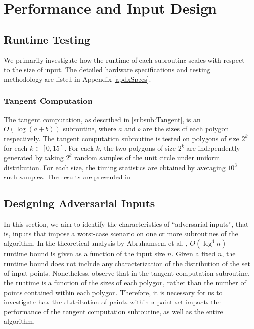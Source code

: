 \documentclass{article}
\newcommand{\apdxref}[1]{Appendix \ref{#1}}
\begin{document}
\section{Performance and Input Design}


\subsection{Runtime Testing}

We primarily investigate how the runtime of each subroutine scales with respect to the size of input. The detailed hardware specifications and testing methodology are listed in \apdxref{apdxSpecs}.

\subsubsection{Tangent Computation}

The tangent computation, as described in \ref{subsub:Tangent}, is an $O(\log(a + b))$ subroutine, where $a$ and $b$ are the sizes of each polygon respectively. The tangent computation subroutine is tested on polygons of size $2^k$ for each $k \in [0, 15]$. For each $k$, the two polygons of size $2^k$ are independently generated by taking $2^k$ random samples of the unit circle under uniform distribution. For each size, the timing statistics are obtained by averaging $10^3$ such samples. The results are presented in  

\subsection{Designing Adversarial Inputs}

In this section, we aim to identify the characteristics of ``adversarial inputs'', that is, inputs that impose a worst-case scenario on one or more subroutines of the algorithm. In the theoretical analysis by Abrahamsem et al. \cite{abb17}, $O(\log^4 n)$ runtime bound is given as a function of the input size $n$. Given a fixed $n$, the runtime bound does not include any characterization of the distribution of the set of input points. Nonetheless, observe that in the tangent computation subroutine, the runtime is a function of the sizes of each polygon, rather than the number of points contained within each polygon. Therefore, it is necessary for us to investigate how the distribution of points within a point set impacts the performance of the tangent computation subroutine, as well as the entire algorithm.
\end{document}
